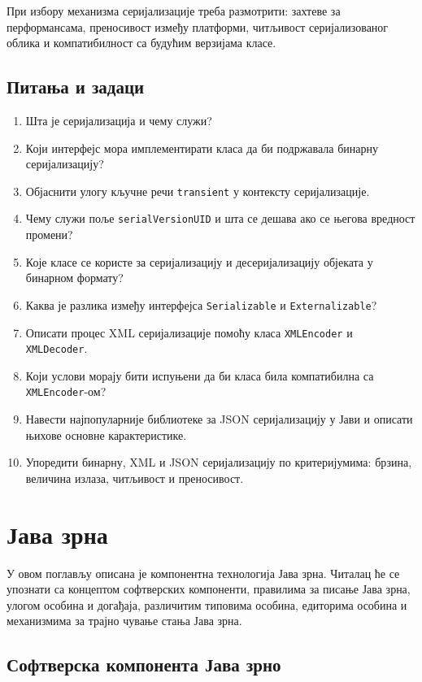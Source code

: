 При избору механизма серијализације треба размотрити: захтеве за перформансама, преносивост између платформи, читљивост серијализованог облика и компатибилност са будућим верзијама класе.


\section{Питања и задаци}

\begin{enumerate}
\item Шта је серијализација и чему служи?
\item Који интерфејс мора имплементирати класа да би подржавала бинарну серијализацију?
\item Објаснити улогу кључне речи \texttt{transient} у контексту серијализације.
\item Чему служи поље \texttt{serialVersionUID} и шта се дешава ако се његова вредност промени?
\item Које класе се користе за серијализацију и десеријализацију објеката у бинарном формату?
\item Каква је разлика између интерфејса \texttt{Serializable} и \texttt{Externalizable}?
\item Описати процес XML серијализације помоћу класа \texttt{XMLEncoder} и \texttt{XMLDecoder}.
\item Који услови морају бити испуњени да би класа била компатибилна са \texttt{XMLEncoder}-ом?
\item Навести најпопуларније библиотеке за JSON серијализацију у Јави и описати њихове основне карактеристике.
\item Упоредити бинарну, XML и JSON серијализацију по критеријумима: брзина, величина излаза, читљивост и преносивост.
\end{enumerate}


\setlength{\parindent}{15pt}
\setlength{\parskip}{0pt}
\chapter{Јава зрна}

У овом поглављу описана је компонентна технологија Јава зрна. Читалац ће се упознати са концептом софтверских компоненти, правилима за писање Јава зрна, улогом особина и догађаја, различитим типовима особина, едиторима особина и механизмима за трајно чување стања Јава зрна.


\section{Софтверска компонента Јава зрно}

